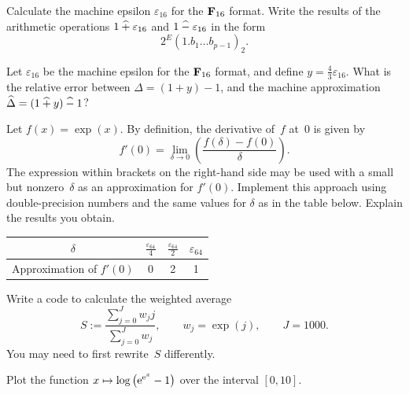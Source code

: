 \begin{exercise}
    Calculate the machine epsilon $\varepsilon_{16}$ for the $\mathbf F_{16}$ format.
    Write the results of the arithmetic operations $1 \mathbin{\widehat +} \varepsilon_{16}$ and $1 \mathbin{\widehat -} \varepsilon_{16}$ in the form
    \[
        2^E (1.b_1 \dotsc b_{p-1})_2.
    \]
\end{exercise}

\begin{exercise}
    Let $\varepsilon_{16}$ be the machine epsilon for the $\mathbf F_{16}$ format,
    and define $y = \frac{4}{3} \varepsilon_{16}$.
    What is the relative error between $\Delta = (1 + y) - 1$,
    and the machine approximation $\widehat \Delta = (1 \mathbin{\widehat +} y) \mathbin{\widehat -} 1$?
\end{exercise}

\begin{compexercise}
    Let $f(x) = \exp(x)$.
    By definition, the derivative of~$f$ at~$0$ is given by
    \[
        f'(0) = \lim_{\delta \to 0} \left( \frac{f(\delta) - f(0)}{\delta} \right).
    \]
    The expression within brackets on the right-hand side may be used
    with a small but nonzero~$\delta$ as an approximation for $f'(0)$.
    Implement this approach using double-precision numbers and the same values for $\delta$ as in the table below.
    Explain the results you obtain.
    \begin{center}
        \def\arraystretch{1.5}
        \begin{tabular}{|c|c|c|c|}
            \hline
            $\delta$ & $\frac{\varepsilon_{64}}{4} $ & $\frac{\varepsilon_{64}}{2}$ & $\varepsilon_{64}$ \\
            \hline
            Approximation of $f'(0)$ & 0 & 2 & 1 \\
            \hline
        \end{tabular}
    \end{center}
\end{compexercise}

\begin{compexercise}
    Write a code to calculate the weighted average
    \[
        S := \frac
        {\sum_{j=0}^{J} w_j j}
        {\sum_{j=0}^{J} w_j},
        \qquad w_j = \exp(j),
        \qquad J = 1000.
    \]
    You may need to first rewrite~$S$ differently.
\end{compexercise}

\begin{compexercise}
    Plot the function $x \mapsto \log\left(\mathrm e^{\mathrm e^x} - 1\right)$ over the interval $[0, 10]$.
\end{compexercise}

